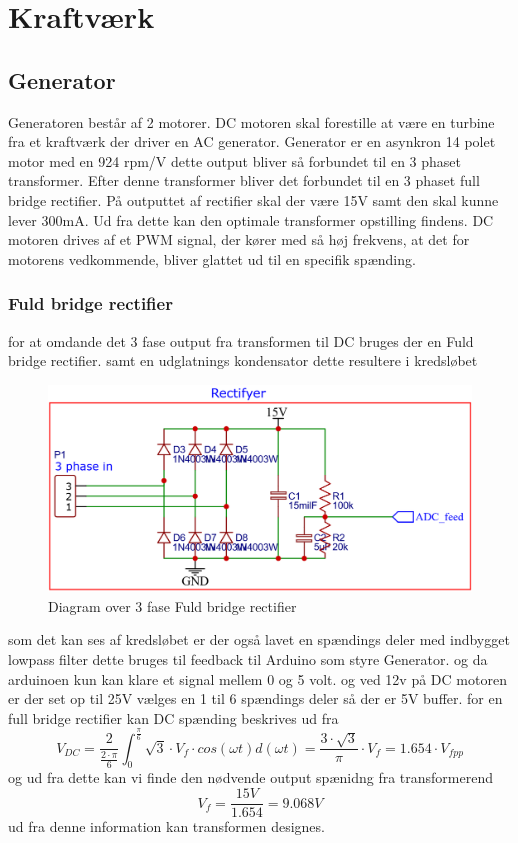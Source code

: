 \documentclass[../main.tex]{subfiles}
\begin{document}
\chapter{Kraftværk} \label{Chap:Kraftværk}

\section{Generator}
Generatoren består af 2 motorer. DC motoren skal forestille at være en turbine fra et kraftværk der driver en AC generator. Generator er en asynkron 14 polet motor med en 924 rpm/V dette output bliver så forbundet til en 3 phaset transformer. Efter denne transformer bliver det forbundet til en 3 phaset full bridge rectifier. På outputtet af rectifier skal der være 15V samt den skal kunne lever 300mA. Ud fra dette kan den optimale transformer opstilling findens. DC motoren drives af et PWM signal, der kører med så høj frekvens, at det for motorens vedkommende, bliver glattet ud til en specifik spænding.

\subsection{Fuld bridge rectifier}
for at omdande det 3 fase output fra transformen til DC bruges der en Fuld bridge rectifier. samt en udglatnings kondensator dette resultere i kredsløbet 

\begin{figure}[H]
      \includegraphics[width=\textwidth]{Dokumentation/Figures/Rectifyer_dig.png}
     \caption{Diagram over 3 fase Fuld bridge rectifier}
     \label{fig: Rectifyer_dig}
     \end{figure}
som det kan ses af kredsløbet er der også lavet en spændings deler med indbygget lowpass filter dette bruges til feedback til Arduino som styre Generator. og da arduinoen kun kan klare et signal mellem 0 og 5 volt. og ved  12v på DC motoren er der set op til 25V vælges en 1 til 6 spændings deler så der er 5V buffer.
for en full bridge rectifier kan DC spænding  beskrives ud fra 
$$ V_{DC} = \frac{2}{\frac{2 \cdot \pi}{6}}\int_{0}^{\frac{\pi}{6}}\sqrt{3}\cdot V_f \cdot cos(\omega t) d(\omega t) = \frac{3 \cdot \sqrt{3}}{\pi} \cdot V_f = 1.654 \cdot V_{fpp} $$
og ud fra dette kan vi finde den nødvende output spænidng fra transformerend 
$$ V_{f}= \frac{15V}{1.654} = 9.068V$$
ud fra denne information kan transformen designes.
\end{document}
